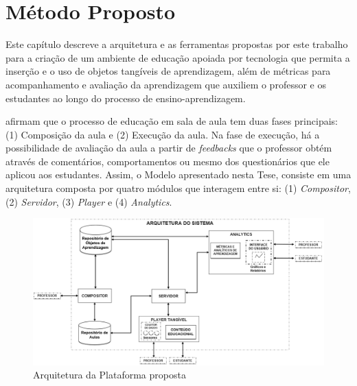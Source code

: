 
\chapter{Método Proposto} \label{Chap:prosedMethod}

Este capítulo descreve a arquitetura e as ferramentas propostas por este trabalho para a criação de um ambiente de educação apoiada por tecnologia que permita a inserção e o uso de objetos tangíveis de aprendizagem, além de métricas para acompanhamento e avaliação da aprendizagem que auxiliem o professor e os estudantes ao longo do processo de ensino-aprendizagem.

\cite{Zilse:2016} afirmam que o processo de educação em sala de aula tem duas fases principais: (1) Composição da aula e (2) Execução da aula. Na fase de execução, há a possibilidade de avaliação da aula a partir de \textit{feedbacks} que o professor obtém através de comentários, comportamentos ou mesmo dos questionários que ele aplicou aos estudantes. Assim, o Modelo apresentado nesta Tese, consiste em uma arquitetura composta por quatro módulos que interagem entre si: (1) \textit{Compositor}, (2) \textit{Servidor}, (3)  \textit{Player} e (4) \textit{Analytics}.

\begin{figure}[htb]
\centering
\includegraphics[width=1\linewidth]{chapters/proposedMethod/arquitetura_v4_1.png}
\caption{Arquitetura da Plataforma proposta}
\label{fig:arquitetura}
\end{figure}

